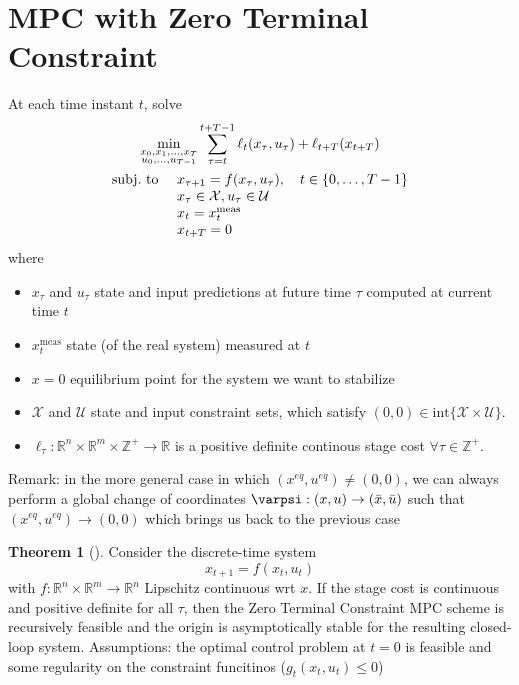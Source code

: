 \documentclass{book}
\newcommand{\R}{\mathbb{R}}
\theoremstyle{definition}
\newtheorem{theorem}{Theorem}[section]
\theoremstyle{remark}
\theoremstyle{remark}
\begin{document}
\section{MPC with Zero Terminal Constraint} 
At each time instant $t$, solve
\begin{gather*}
    \min_{\substack{x_0,x_1,\dots,x_T\\u_0,\dots,u_{T-1}}} \displaystyle\sum_{\tau=t}^{t+T-1}\ell_t(x_\tau,u_\tau)+\ell_{t+T}(x_{t+T})\\
    \begin{array}{l l }
        \text{subj.\ to } & x_{\tau+1}=f(x_\tau,u_\tau), \quad t\in\{0,\dots,T-1\}\\
                          & x_\tau \in \mathcal{X}, u_\tau \in \mathcal{U}  \\
                          & x_t = x_t^{\text{meas}} \\
                          & x_{t+T}=0
    \end{array}
\end{gather*}
where 
\begin{itemize}
    \item $x_{\tau}$ and $u_\tau$ state and input predictions at future time $\tau$ computed at current time $t$ 
    \item $x_t^{\text{meas}}$ state (of the real system) measured at $t$ 
    \item $x=0$ equilibrium point for the system we want to stabilize 
    \item $\mathcal{X}$ and $\mathcal{U}$ state and input constraint sets, which satisfy $(0,0)\in \text{int}\{\mathcal{X}\times \mathcal{U}\}$.
    \item $\ell_\tau:\R^n\times \R^m \times \mathbb{Z}^+\to \R$ is a positive definite continous stage cost $\forall\tau\in\mathbb{Z}^+$.
\end{itemize}
Remark: in the more general case in which $(x^{eq},u^{eq})\neq (0,0)$, we can always perform a global change of coordinates $\varpsi:(x,u)\to(\bar{x},\bar{u})$ such that $(x^{eq},u^{eq})\to(0,0)$ which brings us back to the previous case 
\begin{theorem}[]
    Consider the discrete-time system
    \[
        x_{t+1}=f(x_t,u_t)
    \]
    with $f:\R^n\times\R^m\to\R^n$ Lipschitz continuous wrt $x$. If the stage cost is continuous and positive definite for all $\tau$, then the Zero Terminal Constraint MPC scheme is recursively feasible and the origin is asymptotically stable for the resulting closed-loop system.
    Assumptions: the optimal control problem at $t=0$ is feasible and some regularity on the constraint funcitinos ($g_t(x_t,u_t)\leq0$)
\end{theorem}
\end{document}

